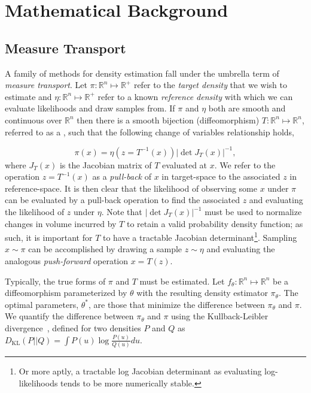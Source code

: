 \chapter{Mathematical Background}\label{ch:background}

\section{Measure Transport}\label{sec:measure-transport}

A family of methods for density estimation fall under the umbrella term of \textit{measure transport}.
Let $\pi: \mathbb{R}^n \mapsto \mathbb{R}^+$ refer to the \textit{target density} that we wish to estimate
and $\eta: \mathbb{R}^n \mapsto \mathbb{R}^+$ refer to a known \textit{reference density} with which we can evaluate
likelihoods and draw samples from.
If $\pi$ and $\eta$ both are smooth and continuous over $\mathbb{R}^n$ then there is a smooth bijection (diffeomorphism)
$T: \mathbb{R}^n \mapsto \mathbb{R}^n$, referred to as a , such that the following change of variables
relationship holds,

\begin{equation*}
    \pi(x) = \eta\left( z=T^{-1}(x) \right) \left| \det J_T(x) \right|^{-1},
    \label{eq:change-of-vars}
\end{equation*}
where $J_T(x)$ is the Jacobian matrix of $T$ evaluated at $x$.
We refer to the operation $z = T^{-1}(x)$ as a \textit{pull-back} of $x$ in target-space to the associated $z$ in
reference-space.
It is then clear that the likelihood of observing some $x$ under $\pi$ can be evaluated by a
pull-back operation to find the associated $z$ and evaluating the likelihood of $z$ under $\eta$.
Note that $\left| \det J_T(x) \right|^{-1}$ must be used to normalize changes in volume incurred by $T$ to retain a
valid probability density function; as such, it is important for $T$ to have a tractable Jacobian determinant\footnote{
Or more aptly, a tractable log Jacobian determinant as evaluating log-likelihoods tends to be more numerically stable.
}.
Sampling $x \sim \pi$ can be accomplished by drawing a sample $z \sim \eta$ and evaluating the analogous
\textit{push-forward} operation $x = T(z)$.

Typically, the true forms of $\pi$ and $T$ must be estimated.
Let $f_\theta : \mathbb{R}^n \mapsto \mathbb{R}^n$ be a diffeomorphism parameterized by $\theta$ with the resulting
density estimator $\pi_\theta$.
The optimal parameters, $\theta^*$, are those that minimize the difference between $\pi_\theta$ and $\pi$.
We quantify the difference between $\pi_\theta$ and $\pi$ using the Kullback-Leibler divergence~\cite{kl_div},
defined for two densities $P$ and $Q$ as $D_{\text{KL}}(P || Q) = \int P(u) \log \frac{P(u)}{Q(u)} du$.

